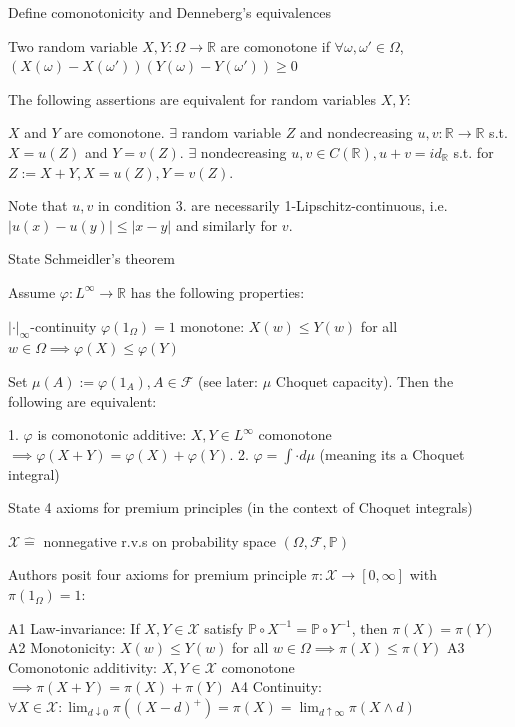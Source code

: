 \documentclass[11pt,a4paper,twoside]{article}
\begin{document}
Define comonotonicity and Denneberg's equivalences

Two random variable \( X, Y : \Omega \to \mathbb{R} \) are comonotone if
\( \forall \omega, \omega' \in \Omega \),
\( (X(\omega) - X(\omega'))(Y(\omega) - Y(\omega')) \geq 0\)

The following assertions are equivalent for random variables \(X, Y\):

\(X\) and \(Y\) are comonotone.
\(\exists\) random variable \(Z\) and nondecreasing \(u, v: \mathbb{R} \rightarrow \mathbb{R}\) s.t. \(X = u(Z)\) and \(Y = v(Z)\).
\(\exists\) nondecreasing \(u, v \in C(\mathbb{R}), u + v = id_{\mathbb{R}}\) s.t. for \(Z := X + Y, X = u(Z), Y = v(Z)\).

Note that \(u, v\) in condition 3. are necessarily 1-Lipschitz-continuous, i.e. \(|u(x) - u(y)| \le |x - y|\) and similarly for \(v\).


State Schmeidler's theorem

Assume \(\varphi: L^\infty \rightarrow \mathbb{R}\) has the following properties:

\(|\cdot|_\infty\)-continuity
\(\varphi(1_\Omega) = 1\)
monotone: \(X(w) \le Y(w)\) for all \(w \in \Omega \implies \varphi(X) \le \varphi(Y)\)

Set \(\mu(A) := \varphi(1_A), A \in \mathcal{F}\) (see later: \(\mu\) Choquet capacity). Then the following are equivalent:

1. \(\varphi\) is comonotonic additive: \(X, Y \in L^\infty\) comonotone \(\implies \varphi(X + Y) = \varphi(X) + \varphi(Y)\).
2. \(\varphi = \int \cdot d \mu\) (meaning its a Choquet integral)


State 4 axioms for premium principles (in the context of Choquet integrals)

\(\mathcal{X} \hat{=}\) nonnegative r.v.s on probability space \((\Omega, \mathcal{F}, \mathbb{P})\)

Authors posit four axioms for premium principle \(\pi: \mathcal{X} \rightarrow [0, \infty]\) with \(\pi(1_\Omega) = 1\):

A1 Law-invariance: If \(X, Y \in \mathcal{X}\) satisfy \(\mathbb{P} \circ X^{-1} = \mathbb{P} \circ Y^{-1}\), then \(\pi(X) = \pi(Y)\)
A2 Monotonicity: \(X(w) \le Y(w)\) for all \(w \in \Omega \implies \pi(X) \le \pi(Y)\)
A3 Comonotonic additivity: \(X, Y \in \mathcal{X}\) comonotone \(\implies \pi(X + Y) = \pi(X) + \pi(Y)\)
A4 Continuity: \(\forall X \in \mathcal{X}: \lim_{d \downarrow 0} \pi((X - d)^+) = \pi(X) = \lim_{d \uparrow \infty} \pi(X \wedge d)\)
\end{document}
